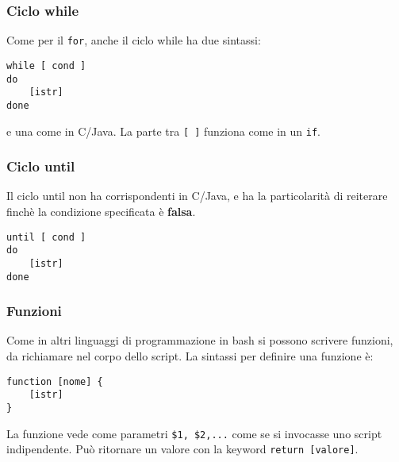 \documentclass[a4paper]{article}
\begin{document}
\subsubsection{Ciclo while}
Come per il \verb|for|, anche il ciclo while ha due sintassi:
\begin{verbatim}
while [ cond ]
do
    [istr]
done
\end{verbatim}
e una come in C/Java. La parte tra \verb|[ ]| funziona come in un \verb|if|.

\subsubsection{Ciclo until}
Il ciclo until non ha corrispondenti in C/Java, e ha la particolarità di reiterare finchè la condizione specificata è \textbf{falsa}.
\begin{verbatim}
until [ cond ]
do
    [istr]
done
\end{verbatim}

\subsubsection{Funzioni}
Come in altri linguaggi di programmazione in bash si possono scrivere funzioni, da richiamare nel corpo dello script.
La sintassi per definire una funzione è:
\begin{verbatim}
function [nome] {
    [istr]
}
\end{verbatim}
La funzione vede come parametri \verb|$1, $2,...| come se si invocasse uno script indipendente. Può ritornare un valore con la keyword \verb|return [valore]|.
\end{document}
